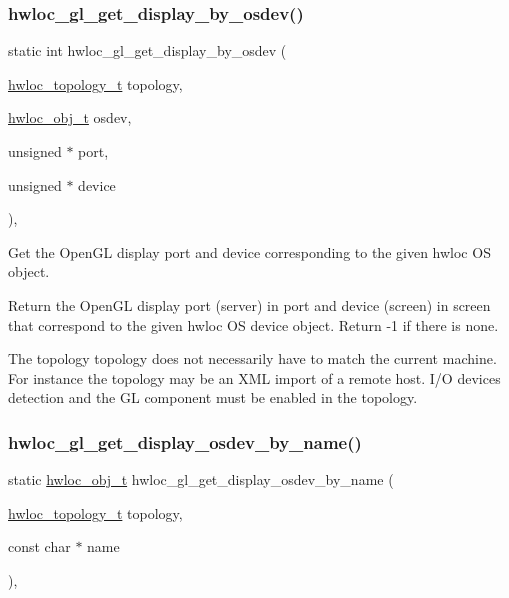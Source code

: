 \subsubsection{\texorpdfstring{hwloc\+\_\+gl\+\_\+get\+\_\+display\+\_\+by\+\_\+osdev()}{hwloc\_gl\_get\_display\_by\_osdev()}}
{\footnotesize\ttfamily static int hwloc\+\_\+gl\+\_\+get\+\_\+display\+\_\+by\+\_\+osdev (\begin{DoxyParamCaption}\item[{\hyperlink{a00186_ga9d1e76ee15a7dee158b786c30b6a6e38}{hwloc\+\_\+topology\+\_\+t}}]{topology,  }\item[{\hyperlink{a00185_ga79b8ab56877ef99ac59b833203391c7d}{hwloc\+\_\+obj\+\_\+t}}]{osdev,  }\item[{unsigned $\ast$}]{port,  }\item[{unsigned $\ast$}]{device }\end{DoxyParamCaption})\hspace{0.3cm}{\ttfamily [inline]}, {\ttfamily [static]}}



Get the Open\+GL display port and device corresponding to the given hwloc OS object. 

Return the Open\+GL display port (server) in {\ttfamily port} and device (screen) in {\ttfamily screen} that correspond to the given hwloc OS device object. Return {\ttfamily -\/1} if there is none.

The topology {\ttfamily topology} does not necessarily have to match the current machine. For instance the topology may be an X\+ML import of a remote host. I/O devices detection and the GL component must be enabled in the topology. \mbox{\label{a00223_ga2d36ef441d1dfddf49cfb5c01bd58d8e}} 
\subsubsection{\texorpdfstring{hwloc\+\_\+gl\+\_\+get\+\_\+display\+\_\+osdev\+\_\+by\+\_\+name()}{hwloc\_gl\_get\_display\_osdev\_by\_name()}}
{\footnotesize\ttfamily static \hyperlink{a00185_ga79b8ab56877ef99ac59b833203391c7d}{hwloc\+\_\+obj\+\_\+t} hwloc\+\_\+gl\+\_\+get\+\_\+display\+\_\+osdev\+\_\+by\+\_\+name (\begin{DoxyParamCaption}\item[{\hyperlink{a00186_ga9d1e76ee15a7dee158b786c30b6a6e38}{hwloc\+\_\+topology\+\_\+t}}]{topology,  }\item[{const char $\ast$}]{name }\end{DoxyParamCaption})\hspace{0.3cm}{\ttfamily [inline]}, {\ttfamily [static]}}



